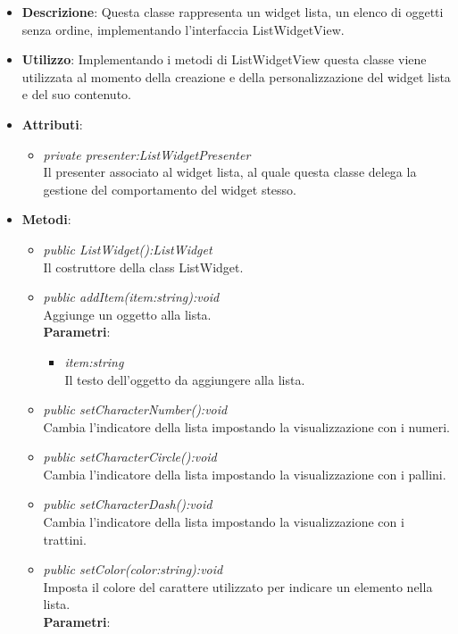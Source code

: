 \begin{itemize}
\item \textbf{Descrizione}: Questa classe rappresenta un widget lista, un elenco di oggetti senza ordine, implementando l'interfaccia ListWidgetView.
\item \textbf{Utilizzo}: Implementando i metodi di ListWidgetView questa classe viene utilizzata al momento della creazione e della personalizzazione del widget lista e del suo contenuto.
\item \textbf{Attributi}:
	\begin{itemize}
	\item \textit{private presenter:ListWidgetPresenter}\\
	Il presenter associato al widget lista, al quale questa classe delega la gestione del comportamento del widget stesso.
	\end{itemize}
\item \textbf{Metodi}:
	\begin{itemize}
	\item \textit{public ListWidget():ListWidget}\\
	Il costruttore della class ListWidget.
	\item \textit{public addItem(item:string):void}\\
	Aggiunge un oggetto alla lista.
		\\ \textbf{Parametri}: \begin{itemize}
		\item \textit{item:string}\\
		Il testo dell'oggetto da aggiungere alla lista.
		\end{itemize} 
	\item \textit{public setCharacterNumber():void}\\
	Cambia l'indicatore della lista impostando la visualizzazione con i numeri.
	\item \textit{public setCharacterCircle():void}\\
	Cambia l'indicatore della lista impostando la visualizzazione con i pallini.
	\item \textit{public setCharacterDash():void}\\
	Cambia l'indicatore della lista impostando la visualizzazione con i trattini.
	\item \textit{public setColor(color:string):void}\\
		Imposta il colore del carattere utilizzato per indicare un elemento nella lista.
		\\ \textbf{Parametri}: \begin{itemize}

\end{itemize}
\end{itemize}
\end{itemize}
